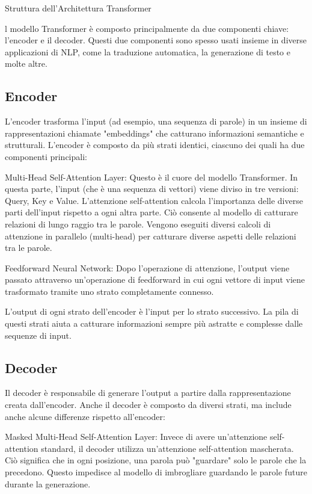 Struttura dell'Architettura Transformer

l modello Transformer è composto principalmente da due componenti chiave: l'encoder e il decoder. Questi due componenti sono spesso usati insieme in diverse applicazioni di NLP, come la traduzione automatica, la generazione di testo e molte altre.

\subsection{Encoder}
L'encoder trasforma l'input (ad esempio, una sequenza di parole) in un insieme di rappresentazioni chiamate "embeddings" che catturano informazioni semantiche e strutturali. L'encoder è composto da più strati identici, ciascuno dei quali ha due componenti principali:

Multi-Head Self-Attention Layer: Questo è il cuore del modello Transformer. In questa parte, l'input (che è una sequenza di vettori) viene diviso in tre versioni: Query, Key e Value. L'attenzione self-attention calcola l'importanza delle diverse parti dell'input rispetto a ogni altra parte. Ciò consente al modello di catturare relazioni di lungo raggio tra le parole. Vengono eseguiti diversi calcoli di attenzione in parallelo (multi-head) per catturare diverse aspetti delle relazioni tra le parole.

Feedforward Neural Network: Dopo l'operazione di attenzione, l'output viene passato attraverso un'operazione di feedforward in cui ogni vettore di input viene trasformato tramite uno strato completamente connesso.

L'output di ogni strato dell'encoder è l'input per lo strato successivo. La pila di questi strati aiuta a catturare informazioni sempre più astratte e complesse dalle sequenze di input.

\subsection{Decoder}
Il decoder è responsabile di generare l'output a partire dalla rappresentazione creata dall'encoder. Anche il decoder è composto da diversi strati, ma include anche alcune differenze rispetto all'encoder:

Masked Multi-Head Self-Attention Layer: Invece di avere un'attenzione self-attention standard, il decoder utilizza un'attenzione self-attention mascherata. Ciò significa che in ogni posizione, una parola può "guardare" solo le parole che la precedono. Questo impedisce al modello di imbrogliare guardando le parole future durante la generazione.

